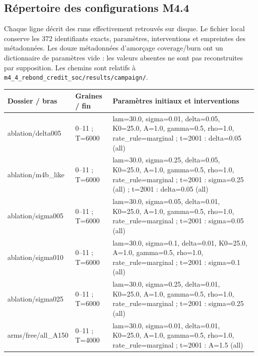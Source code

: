\subsection{Répertoire des configurations M4.4}
Chaque ligne décrit des runs effectivement retrouvés sur disque. Le fichier
local  conserve les 372 identifiants exacts,
paramètres, interventions et empreintes des métadonnées.
Les douze métadonnées d'amorçage coverage/burn ont un dictionnaire de paramètres vide : les valeurs absentes ne sont pas reconstruites par supposition. Les chemins sont
relatifs à \texttt{m4\_4\_rebond\_credit\_soc/results/campaign/}.
{\scriptsize\begin{longtable}{@{}p{.27\linewidth}p{.14\linewidth}p{.53\linewidth}@{}}
\toprule Dossier / bras & Graines / fin & Paramètres initiaux et interventions \\\midrule\endhead
ablation/\allowbreak{}delta005 & 0--11 ; T=6000 & lam=30.0,\allowbreak{}  sigma=0.01,\allowbreak{}  delta=0.05,\allowbreak{}  K0=25.0,\allowbreak{}  A=1.0,\allowbreak{}  gamma=0.5,\allowbreak{}  rho=1.0,\allowbreak{}  rate\_\allowbreak{}rule=marginal ; t=2001 : delta=0.05 (all) \\
ablation/\allowbreak{}m4b\_\allowbreak{}like & 0--11 ; T=6000 & lam=30.0,\allowbreak{}  sigma=0.25,\allowbreak{}  delta=0.05,\allowbreak{}  K0=25.0,\allowbreak{}  A=1.0,\allowbreak{}  gamma=0.5,\allowbreak{}  rho=1.0,\allowbreak{}  rate\_\allowbreak{}rule=marginal ; t=2001 : sigma=0.25 (all) ; t=2001 : delta=0.05 (all) \\
ablation/\allowbreak{}sigma005 & 0--11 ; T=6000 & lam=30.0,\allowbreak{}  sigma=0.05,\allowbreak{}  delta=0.01,\allowbreak{}  K0=25.0,\allowbreak{}  A=1.0,\allowbreak{}  gamma=0.5,\allowbreak{}  rho=1.0,\allowbreak{}  rate\_\allowbreak{}rule=marginal ; t=2001 : sigma=0.05 (all) \\
ablation/\allowbreak{}sigma010 & 0--11 ; T=6000 & lam=30.0,\allowbreak{}  sigma=0.1,\allowbreak{}  delta=0.01,\allowbreak{}  K0=25.0,\allowbreak{}  A=1.0,\allowbreak{}  gamma=0.5,\allowbreak{}  rho=1.0,\allowbreak{}  rate\_\allowbreak{}rule=marginal ; t=2001 : sigma=0.1 (all) \\
ablation/\allowbreak{}sigma025 & 0--11 ; T=6000 & lam=30.0,\allowbreak{}  sigma=0.25,\allowbreak{}  delta=0.01,\allowbreak{}  K0=25.0,\allowbreak{}  A=1.0,\allowbreak{}  gamma=0.5,\allowbreak{}  rho=1.0,\allowbreak{}  rate\_\allowbreak{}rule=marginal ; t=2001 : sigma=0.25 (all) \\
arms/\allowbreak{}free/\allowbreak{}all\_\allowbreak{}A150 & 0--11 ; T=4000 & lam=30.0,\allowbreak{}  sigma=0.01,\allowbreak{}  delta=0.01,\allowbreak{}  K0=25.0,\allowbreak{}  A=1.0,\allowbreak{}  gamma=0.5,\allowbreak{}  rho=1.0,\allowbreak{}  rate\_\allowbreak{}rule=marginal ; t=2001 : A=1.5 (all) \\

\end{longtable}}
